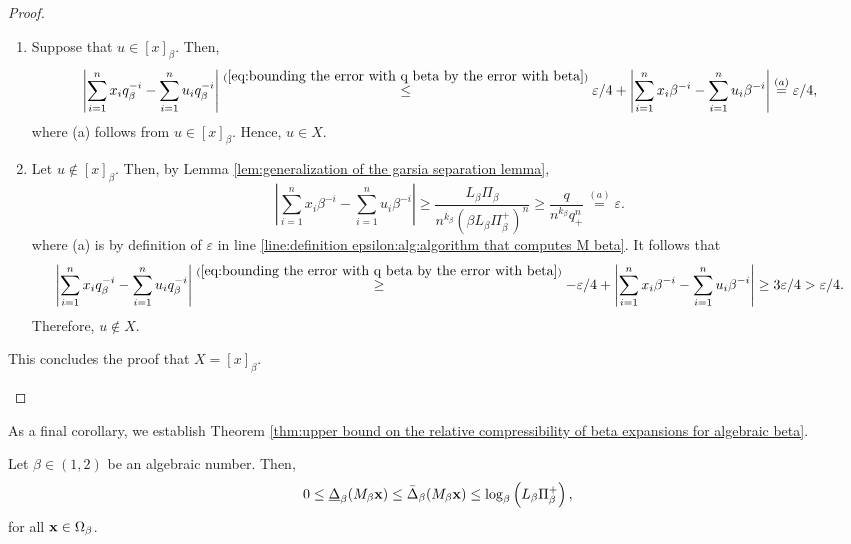 \begin{proof}
\begin{enumerate}[label=(\alph*)]
            \begin{enumerate}[label = (\roman*)]
                \item Suppose that $u \in [x]_\beta$. Then,
                \begin{equation}
                    \left| \sum_{i=1}^n x_i q_\beta^{-i} - \sum_{i=1}^n u_i q_\beta^{-i} \right| \overset{(\ref{eq:bounding the error with q beta by the error with beta})}{\leq} \varepsilon/4 + \left|\sum_{i=1}^n x_i \beta^{-i} - \sum_{i=1}^n u_i \beta^{-i}\right| \overset{(a)}{=} \varepsilon/4,
                \end{equation}
                where (a) follows from $u \in [x]_\beta$. Hence, $u \in X$.
                \item Let $u \notin [x]_\beta$. Then, by Lemma \ref{lem:generalization of the garsia separation lemma},
                \begin{equation}
                    \left|\sum_{i=1}^n x_i \beta^{-i} - \sum_{i=1}^n u_i \beta^{-i}\right| \geq \frac{L_\beta\Pi_\beta}{\displaystyle  n^{k_\beta}\left(\beta L_\beta \Pi_\beta^+ \right)^n} \geq \frac{q}{n^{k_\beta} q_+^n} \overset{(a)}{=} \varepsilon.
                \end{equation}
                where (a) is by definition of $\varepsilon$ in line \ref{line:definition epsilon:alg:algorithm that computes M beta}. It follows that 
                \begin{equation}
                    \left| \sum_{i=1}^n x_i q_\beta^{-i} - \sum_{i=1}^n u_i q_\beta^{-i} \right| \overset{(\ref{eq:bounding the error with q beta by the error with beta})}{\geq} -\varepsilon/4 + \left|\sum_{i=1}^n x_i \beta^{-i} - \sum_{i=1}^n u_i \beta^{-i}\right| \geq 3\varepsilon/4 > \varepsilon/4.
                \end{equation}
                Therefore, $u \notin X$.
            \end{enumerate}
            This concludes the proof that $X = [x]_\beta$.
        \end{enumerate}
\end{proof}
\noindent As a final corollary, we establish Theorem \ref{thm:upper bound on the relative compressibility of beta expansions for algebraic beta}.
\begin{corollary}\label{cor:upper bound on the relative compressibility of beta expansions for algebraic beta}
    Let $\beta \in (1,2)$ be an algebraic number. Then,
		\begin{equation}
			0 \leq \underline\Delta_\beta(M_\beta{\bf x}) \leq \bar\Delta_\beta(M_\beta{\bf x}) \leq \log_\beta\left(L_\beta \Pi_\beta^+\right),
		\end{equation}
		for all ${\bf x} \in \Omega_\beta$.
\end{corollary}
